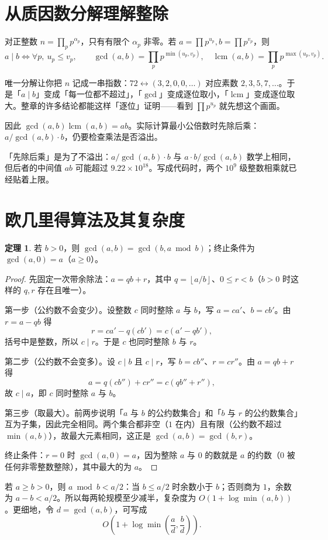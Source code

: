 \documentclass[UTF8,a4paper,11pt,twoside,openright,fontset=fandol]{ctexbook}
\theoremstyle{definition}
\newtheorem{theorem}[definition]{定理}
\newcommand{\lcm}{\operatorname{lcm}}
\newcommand{\floor}[1]{\left\lfloor #1\right\rfloor}
\begin{document}
\section{从质因数分解理解整除}
对正整数 $n=\prod_p p^{\alpha_p}$，只有有限个 $\alpha_p$ 非零。若 $a=\prod p^{u_p},b=\prod p^{v_p}$，则
\[
 a\mid b\iff\forall p,\ u_p\le v_p,\qquad
 \gcd(a,b)=\prod_p p^{\min(u_p,v_p)},\quad
 \lcm(a,b)=\prod_p p^{\max(u_p,v_p)}.
\]

\begin{tip}
唯一分解让你把 $n$ 记成一串指数：$72\leftrightarrow(3,2,0,0,\ldots)$ 对应素数 $2,3,5,7,\ldots$。于是「$a\mid b$」变成「每一位都不超过」，「$\gcd$」变成逐位取小，「$\lcm$」变成逐位取大。整章的许多结论都能这样「逐位」证明——看到 $\prod p^{u_p}$ 就先想这个画面。
\end{tip}

因此 $\gcd(a,b)\lcm(a,b)=ab$。实际计算最小公倍数时先除后乘：$a/\gcd(a,b)\cdot b$，仍要检查乘法是否溢出。


\begin{tip}
「先除后乘」是为了不溢出：$a/\gcd(a,b)\cdot b$ 与 $a\cdot b/\gcd(a,b)$ 数学上相同，但后者的中间值 $ab$ 可能超过 $9.22\times10^{18}$。写成代码时，两个 $10^9$ 级整数相乘就已经贴着上限。
\end{tip}



\section{欧几里得算法及其复杂度}
\begin{theorem}
若 $b>0$，则 $\gcd(a,b)=\gcd(b,a\bmod b)$；终止条件为 $\gcd(a,0)=a$（$a\ge0$）。
\end{theorem}
\begin{proof}
先固定一次带余除法：$a=qb+r$，其中 $q=\floor{a/b}$、$0\le r<b$（$b>0$ 时这样的 $q,r$ 存在且唯一）。

第一步（公约数不会变少）。设整数 $c$ 同时整除 $a$ 与 $b$，写 $a=ca'$、$b=cb'$。由 $r=a-qb$ 得
\[
 r=ca'-q(cb')=c(a'-qb'),
\]
括号中是整数，所以 $c\mid r$。于是 $c$ 也同时整除 $b$ 与 $r$。

第二步（公约数不会变多）。设 $c\mid b$ 且 $c\mid r$，写 $b=cb''$、$r=cr''$。由 $a=qb+r$ 得
\[
 a=q(cb'')+cr''=c(qb''+r''),
\]
故 $c\mid a$，即 $c$ 同时整除 $a$ 与 $b$。

第三步（取最大）。前两步说明「$a$ 与 $b$ 的公约数集合」和「$b$ 与 $r$ 的公约数集合」互为子集，因此完全相同。两个集合都非空（$1$ 在内）且有限（公约数不超过 $\min(a,b)$），故最大元素相同，这正是 $\gcd(a,b)=\gcd(b,r)$。

终止条件：$r=0$ 时 $\gcd(a,0)=a$，因为整除 $a$ 与 $0$ 的数就是 $a$ 的约数（$0$ 被任何非零整数整除），其中最大的为 $a$。
\end{proof}
若 $a\ge b>0$，则 $a\bmod b<a/2$：当 $b\le a/2$ 时余数小于 $b$；否则商为 $1$，余数为 $a-b<a/2$。所以每两轮规模至少减半，复杂度为 $O(1+\log\min(a,b))$。更细地，令 $d=\gcd(a,b)$，可写成
\[
 O\!\left(1+\log\min\left(\frac ad,\frac bd\right)\right).
\]
\end{document}
